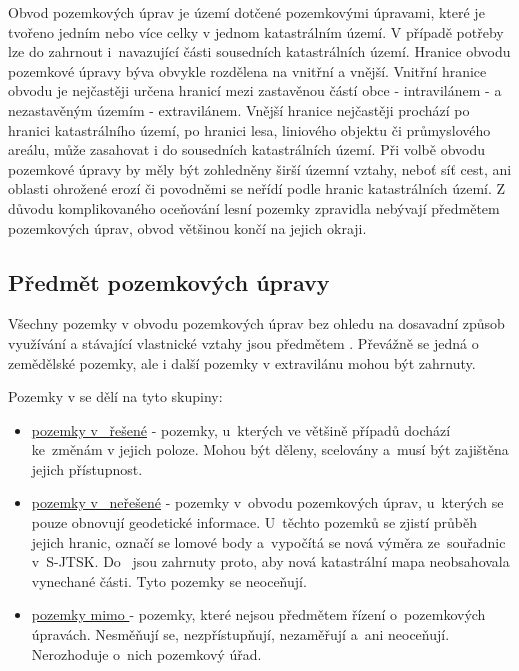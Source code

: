 Obvod pozemkových úprav je území dotčené pozemkovými úpravami, které je tvořeno jedním nebo více celky v jednom katastrálním území. V případě potřeby lze do  zahrnout i~navazující části sousedních katastrálních území. Hranice obvodu pozemkové úpravy býva obvykle rozdělena na vnitřní a vnější. Vnitřní hranice obvodu je nejčastěji určena hranicí mezi zastavěnou částí obce - intravilánem - a nezastavěným územím - extravilánem. Vnější hranice nejčastěji prochází po hranici katastrálního území, po hranici lesa, liniového objektu či průmyslového areálu, může zasahovat i do sousedních katastrálních území. Při volbě obvodu pozemkové úpravy by měly být zohledněny širší územní vztahy, neboť síť cest, ani oblasti ohrožené erozí či povodněmi se neřídí podle hranic katastrálních území. Z důvodu komplikovaného oceňování lesní pozemky zpravidla nebývají předmětem pozemkových úprav, obvod většinou končí na jejich okraji.

\subsection{Předmět pozemkových úpravy}
\label{predmet_pu}

Všechny pozemky v obvodu pozemkových úprav bez ohledu na dosavadní způsob využívání a stávající vlastnické vztahy jsou předmětem . Převážně se jedná o zemědělské pozemky, ale i další pozemky v extravilánu mohou být zahrnuty.

Pozemky v  se dělí na tyto skupiny:
	\begin{itemize}[leftmargin=1.5cm]
		\item \underline{pozemky v~ řešené} - pozemky, u~kterých ve většině případů dochází ke~změnám v jejich poloze. Mohou být děleny, scelovány a~musí být zajištěna jejich přístupnost.
		\item \underline{pozemky v~ neřešené} - pozemky v~obvodu pozemkových úprav, u~kterých se pouze obnovují geodetické informace. U~těchto pozemků se zjistí průběh jejich hranic, označí se lomové body a~vypočítá se nová výměra ze~souřadnic v~S-JTSK. Do~ jsou zahrnuty proto, aby nová katastrální mapa neobsahovala vynechané části. Tyto pozemky se neoceňují.
		\item \underline{pozemky mimo } - pozemky, které nejsou předmětem řízení o~pozemkových úpravách. Nesměňují se, nezpřístupňují, nezaměřují a~ani neoceňují. Nerozhoduje o~nich pozemkový úřad.
	\end{itemize}

